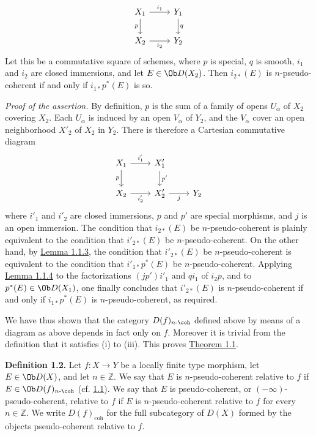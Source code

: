 \[
\begin{tikzcd}
X_1 \arrow[r,"i_1"] \arrow[d,"p"'] & Y_1 \arrow[d,"q"]\\
X_2 \arrow[r,"i_2"'] & Y_2
\end{tikzcd}
\]
Let this be a commutative square of schemes, where \(p\) is special, \(q\) is smooth, \(i_1\) and \(i_2\) are closed immersions, and let \(E\in \Ob D(X_2)\). Then \(i_{2*}(E)\) is \(n\)-pseudo-coherent if and only if \(i_{1*}p^*(E)\) is so.

\emph{Proof of the assertion.} By definition, \(p\) is the sum of a family of opens \(U_\alpha\) of \(X_2\) covering \(X_2\). Each \(U_\alpha\) is induced by an open \(V_\alpha\) of \(Y_2\), and the \(V_\alpha\) cover an open neighborhood \(X'_2\) of \(X_2\) in \(Y_2\). There is therefore a Cartesian commutative diagram
\[
\begin{tikzcd}
X_1 \arrow[r,"i'_1"] \arrow[d,"p"'] & X'_1 \arrow[d,"p'"]\\
X_2 \arrow[r,"i'_2"'] & X'_2 \arrow[r,"j"'] & Y_2
\end{tikzcd}
\]
where \(i'_1\) and \(i'_2\) are closed immersions, \(p\) and \(p'\) are special morphisms, and \(j\) is an open immersion. The condition that \(i_{2*}(E)\) be \(n\)-pseudo-coherent is plainly equivalent to the condition that \(i'_{2*}(E)\) be \(n\)-pseudo-coherent. On the other hand, by \hyperlink{sga6.e03.lem.1-1-3}{Lemma 1.1.3}, the condition that \(i'_{2*}(E)\) be \(n\)-pseudo-coherent is equivalent to the condition that \(i'_{1*}p^*(E)\) be \(n\)-pseudo-coherent. Applying \hyperlink{sga6.e03.lem.1-1-4}{Lemma 1.1.4} to the factorizations \((jp')i'_1\) and \(qi_1\) of \(i_2p\), and to \(p^*(E)\in \Ob D(X_1)\), one finally concludes that \(i'_{2*}(E)\) is \(n\)-pseudo-coherent if and only if \(i_{1*}p^*(E)\) is \(n\)-pseudo-coherent, as required.

We have thus shown that the category \(D(f)_{n\text{-}\coh}\) defined above by means of a diagram as above depends in fact only on \(f\). Moreover it is trivial from the definition that it satisfies (i) to (iii). This proves \hyperlink{sga6.e03.thm.1-1}{Theorem 1.1}.

\textbf{Definition 1.2.} Let \(f:X\to Y\) be a locally finite type morphism, let \(E\in \Ob D(X)\), and let \(n\in\mathbb Z\). We say that \(E\) is \(n\)-pseudo-coherent relative to \(f\) if \(E\in \Ob D(f)_{n\text{-}\coh}\) (cf. \hyperlink{sga6.e03.thm.1-1}{1.1}). We say that \(E\) is pseudo-coherent, or \((-\infty)\)-pseudo-coherent, relative to \(f\) if \(E\) is \(n\)-pseudo-coherent relative to \(f\) for every \(n\in\mathbb Z\). We write \(D(f)_{\mathrm{coh}}\) for the full subcategory of \(D(X)\) formed by the objects pseudo-coherent relative to \(f\).

